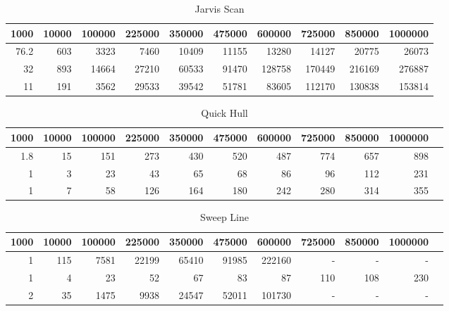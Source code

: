 \documentclass[a4paper, 12pt]{article}
\begin{document}
\begin{table}[h]
	\begin{tabular}{|r|r|r|r|r|r|r|r|r|r|}
	\hline
	  \textbf{1000} 	& \textbf{10000} & \textbf{100000} & \textbf{225000} & \textbf{350000} & \textbf{475000} & \textbf{600000}  & \textbf{725000}
 & \textbf{850000}  & \textbf{1000000}\\ \hline
			 76.2	& 603 	& 3323 & 7460 & 10409 & 11155 & 13280 &	14127 & 20775 & 26073 \\ \hline
	 32	& 893  	& 14664	& 27210 & 60533 & 91470 & 128758 & 170449 & 216169 & 276887 \\ \hline
	 11	& 191  	& 3562 & 29533 & 39542 & 51781 & 83605 & 112170 & 130838 & 153814	 \\ \hline

	
	\end{tabular}
		\caption{Jarvis Scan}
		
\end{table}


\begin{table}[h]
	\begin{tabular}{|r|r|r|r|r|r|r|r|r|r|r|}
	\hline
	 \textbf{1000} 	& \textbf{10000} & \textbf{100000} & \textbf{225000} & \textbf{350000} & \textbf{475000} & \textbf{600000}  & \textbf{725000}
 & \textbf{850000}  & \textbf{1000000}\\ \hline
	 1.8 & 15 & 151 &  273 & 430 & 520 & 487 & 774 & 657 & 898\\ \hline
	 1 & 3 & 23 & 43 & 65 & 68 & 86 & 96 & 112 & 231 \\ \hline
	 1 & 7 & 58 & 126 & 164 & 180 & 242 & 280 & 314 & 355	 \\ \hline

	
	\end{tabular}
		\caption{Quick Hull}
\end{table}






\begin{table}[h]
	\begin{tabular}{|r|r|r|r|r|r|r|r|r|r|r|}
	\hline
	 \textbf{1000} 	& \textbf{10000} & \textbf{100000} & \textbf{225000} & \textbf{350000} & \textbf{475000} & \textbf{600000}  & \textbf{725000}
 & \textbf{850000}  & \textbf{1000000}\\ \hline
	 1 & 115 & 7581 &  22199 & 65410 & 91985 & 222160 & - & - & -\\ \hline
	 1 & 4 & 23 & 52 & 67 & 83 & 87 & 110 & 108 & 230  \\ \hline
	2 & 35 & 1475 & 9938 & 24547 & 52011 & 101730 & - & -& -	 \\ \hline

	
	\end{tabular}
		\caption{Sweep Line}
\end{table}
\end{document}
